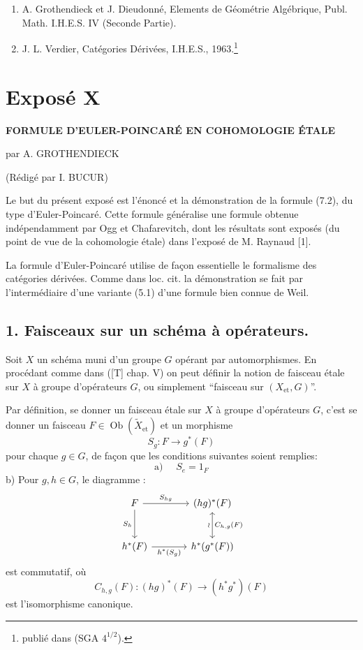 \begin{enumerate}
\item[{[1]}] A. Grothendieck et J. Dieudonné, Elements de Géométrie Algébrique, Publ. Math. I.H.E.S. IV (Seconde Partie).
\item[{[2]}] J. L. Verdier, Catégories Dérivées, I.H.E.S., 1963.\footnote{publié dans (SGA $4^{1/2}$).}
\end{enumerate}

\renewcommand{\Ob}{\operatorname{ob}}
\section*{Exposé X}
\renewcommand{\EP}{\operatorname{\mathbb{EP}}}
\renewcommand{\Ob}{\operatorname{Ob}}

\begin{center}
\textbf{FORMULE D'EULER-POINCARÉ EN COHOMOLOGIE ÉTALE}

par A. GROTHENDIECK

(Rédigé par I. BUCUR)
\end{center}

Le but du présent exposé est l'énoncé et la démonstration de la formule (7.2), du type d'Euler-Poincaré. Cette formule généralise une formule obtenue indépendamment par Ogg et Chafarevitch, dont les résultats sont exposés (du point de vue de la cohomologie étale) dans l'exposé de M. Raynaud [1].

La formule d'Euler-Poincaré utilise de façon essentielle le formalisme des catégories dérivées. Comme dans loc. cit. la démonstration se fait par l'intermédiaire d'une variante (5.1) d'une formule bien connue de Weil.

\subsection*{1. Faisceaux sur un schéma à opérateurs.}

Soit $X$ un schéma muni d'un groupe $G$ opérant par automorphismes. En procédant comme dans ([T] chap. V) on peut définir la notion de faisceau étale sur $X$ à groupe d'opérateurs $G$, ou simplement ``faisceau sur $(X_{\mathrm{et}},G)$''.

Par définition, se donner un faisceau étale sur $X$ à groupe d'opérateurs $G$, c'est se donner un faisceau $F\in \operatorname{Ob}(\widetilde X_{\mathrm{et}})$ et un morphisme
\[
S_g:F\longrightarrow g^*(F)
\]
pour chaque $g\in G$, de façon que les conditions suivantes soient remplies:
\[
\text{a) }\quad S_e=1_F
\]
b) Pour $g,h\in G$, le diagramme :
\[
\begin{tikzcd}[column sep=large,row sep=large]
F \arrow[r,"S_{hg}"] \arrow[d,"S_h"'] & (hg)^*(F) \arrow[d,leftrightarrow,"\wr"',"C_{h,g}(F)"]\\
h^*(F) \arrow[r,"h^*(S_g)"'] & h^*(g^*(F))
\end{tikzcd}
\]
est commutatif, où
\[
C_{h,g}(F):(hg)^*(F)\longrightarrow (h^*g^*)(F)
\]
est l'isomorphisme canonique.

